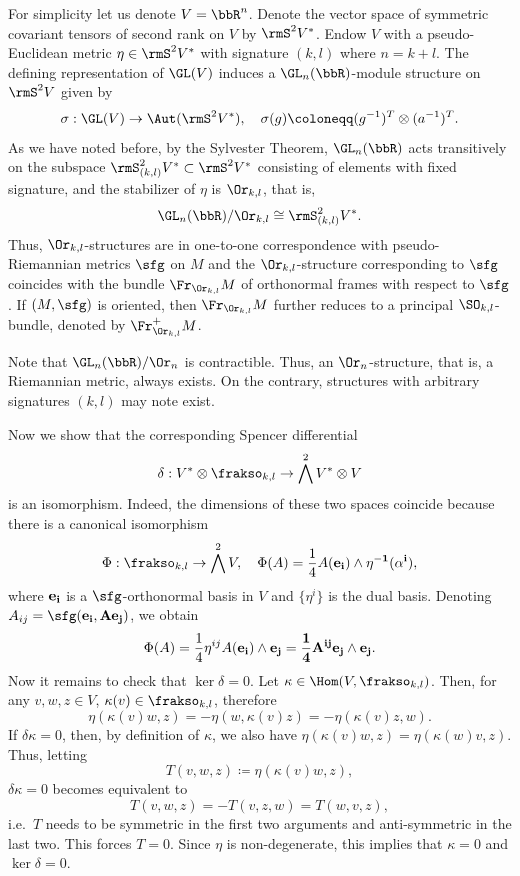 \begin{example}\label{ex pseudo-riemannian structure}
    For simplicity let us denote $V=\bbR^n$. Denote the vector space of symmetric covariant tensors of second rank on $V$ by $\rmS^2V^\ast$. Endow $V$ with a pseudo-Euclidean metric $\eta\in \rmS^2V^\ast$ with signature $(k,l)$ where $n=k+l$. The defining representation of $\GL(V)$ induces a $\GL_n(\bbR)$-module structure on $\rmS^2 V$ given by 
    \[\sigma:\GL(V)\to \Aut(\rmS^2 V^\ast),\quad \sigma(g)\coloneqq (g^{-1})^T\otimes (a^{-1})^T.\label{eq 2.2.21 RS2}\]
    As we have noted before, by the Sylvester Theorem, $\GL_n(\bbR)$ acts transitively on the subspace $\rmS^2_{(k,l)}V^\ast\subset \rmS^2 V^\ast$ consisting of elements with fixed signature, and the stabilizer of $\eta$ is $\Or_{k,l}$, that is,
    \[\GL_n(\bbR)\slash \Or_{k,l}\cong \rmS^2_{(k,l)}V^\ast.\]
    Thus, $\Or_{k,l}$-structures are in one-to-one correspondence with pseudo-Riemannian metrics $\sfg$ on $M$ and the $\Or_{k,l}$-structure corresponding to $\sfg$ coincides with the bundle $\Fr_{\Or_{k,l}}M$ of orthonormal frames with respect to $\sfg$. If $(M,\sfg)$ is oriented, then $\Fr_{\Or_{k,l}}M$ further reduces to a principal $\SO_{k,l}$-bundle, denoted by $\Fr^+_{\Or_{k,l}}M$. 
    
    Note that $\GL_n(\bbR)\slash \Or_n$ is contractible. Thus, an $\Or_n$-structure, that is, a Riemannian metric, always exists. On the contrary, structures with arbitrary signatures $(k,l)$ may note exist. 
    
    Now we show that the corresponding Spencer differential 
    \[\delta: V^\ast\otimes \frakso_{k,l}\to \bigwedge^2 V^\ast\otimes V\]
    is an isomorphism. Indeed, the dimensions of these two spaces coincide because there is a canonical isomorphism 
    \[\Phi: \frakso_{k,l}\to \bigwedge^2 V,\quad \Phi(A)= \frac14 A(\bf{e}_i)\wedge \eta^{-1}(\alpha^i),\]
    where $\bf{e}_i$ is a $\sfg$-orthonormal basis in $V$ and $\{\eta^i\}$ is the dual basis. Denoting $A_{ij}=\sfg(\bf{e}_i,A\bf{e}_j)$, we obtain 
    \[\Phi(A)=\frac14 \eta^{ij}A(\bf{e}_i)\wedge\bf{e}_j=\frac14 A^{ij}\bf{e}_j\wedge\bf{e}_j.\]
    Now it remains to check that $\ker\delta=0$. Let $\kappa\in \Hom(V,\frakso_{k,l})$. Then, for any $v,w,z\in V$, $\kappa(v)\in\frakso_{k,l}$, therefore 
    \[\eta(\kappa(v)w,z)=-\eta(w,\kappa(v)z)=-\eta(\kappa(v)z,w).\]
    If $\delta\kappa=0$, then, by definition of $\kappa$, we  also have $\eta(\kappa(v)w,z)=\eta(\kappa(w)v,z)$. Thus, letting
    \[T(v,w,z)\coloneqq \eta(\kappa(v)w,z),\]
    $\delta\kappa=0$ becomes equivalent to 
    \[T(v,w,z)=-T(v,z,w)=T(w,v,z),\]
    i.e.\ $T$ needs to be symmetric in the first two arguments and anti-symmetric in the last two. This forces $T=0$. Since $\eta$ is non-degenerate, this implies that $\kappa=0$ and $\ker\delta=0$. 
    

\end{example}
